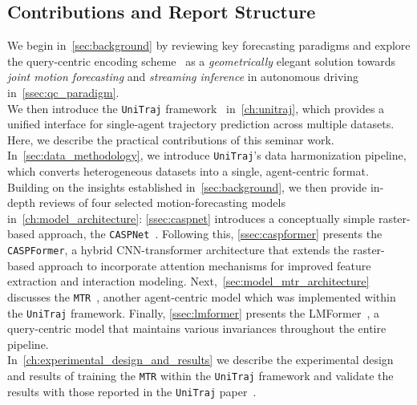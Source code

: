 \subsection{Contributions and Report Structure}
 We begin in~\autoref{sec:background} by reviewing key forecasting paradigms and explore the query-centric encoding scheme~\cite{qcnetZhou2023} as a \emph{geometrically} elegant solution towards \emph{joint motion forecasting} and \emph{streaming inference} in autonomous driving in~\autoref{ssec:qc_paradigm}.\\
 We then introduce the \texttt{UniTraj} framework~\cite{unitrajFeng2024} in~\autoref{ch:unitraj}, which provides a unified interface for single-agent trajectory prediction across multiple datasets. Here, we describe the practical contributions of this seminar work.\\
In~\autoref{sec:data_methodology}, we introduce \texttt{UniTraj}'s data harmonization pipeline, which converts heterogeneous datasets into a single, agent-centric format.\\
Building on the insights established in~\autoref{sec:background},
we then provide in-depth reviews of four selected motion-forecasting models in~\autoref{ch:model_architecture}:
\autoref{ssec:caspnet} introduces a conceptually simple raster-based approach, the \texttt{CASPNet}~\cite{caspnetSchäfer2022}. Following this, \autoref{ssec:caspformer} presents the \texttt{CASPFormer}, a hybrid CNN-transformer architecture that extends the raster-based approach to incorporate attention mechanisms for improved feature extraction and interaction modeling.
Next,~\autoref{sec:model_mtr_architecture} discusses the \texttt{MTR}~\cite{Shi2022MTR}, another agent-centric model which was implemented within the \texttt{UniTraj} framework.
Finally, \autoref{ssec:lmformer} presents the LMFormer~\cite{lmformerYadav2025}, a query-centric model that maintains various invariances throughout the entire pipeline.\\
In~\autoref{ch:experimental_design_and_results} we describe the experimental design and results of training the \texttt{MTR} within the \texttt{UniTraj} framework and validate the results with those reported in the \texttt{UniTraj} paper~\cite{unitrajFeng2024}.

\newpage